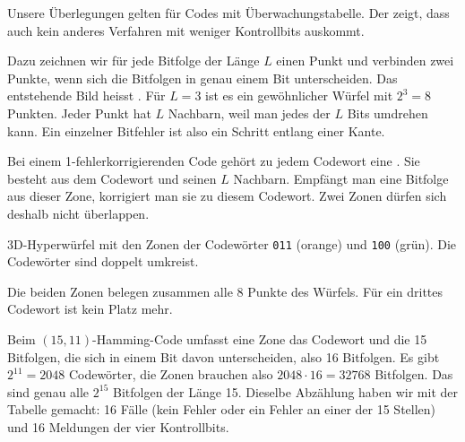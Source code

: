 \begin{myexcursion}
    Unsere Überlegungen gelten für Codes mit Überwachungstabelle. Der
     zeigt, dass auch kein anderes Verfahren mit
    weniger Kontrollbits auskommt.

    Dazu zeichnen wir für jede Bitfolge der Länge \(L\) einen Punkt und
    verbinden zwei Punkte, wenn sich die Bitfolgen in genau einem Bit
    unterscheiden. Das entstehende Bild heisst
    . Für \(L=3\) ist es ein
    gewöhnlicher Würfel mit \(2^3=8\) Punkten. Jeder
    Punkt hat \(L\) Nachbarn, weil man jedes der \(L\) Bits umdrehen
    kann. Ein einzelner Bitfehler ist also ein Schritt entlang einer
    Kante.

    Bei einem 1-fehlerkorrigierenden Code gehört zu jedem Codewort eine
    . Sie besteht aus dem Codewort und seinen \(L\) Nachbarn.
    Empfängt man eine Bitfolge aus dieser Zone, korrigiert man sie zu
    diesem Codewort. Zwei Zonen dürfen sich deshalb nicht überlappen.

    \begin{center}

        {\small 3D-Hyperwürfel mit den Zonen der Codewörter \texttt{011}
        (orange) und \texttt{100} (grün). Die Codewörter sind doppelt
        umkreist.}
    \end{center}

    Die beiden Zonen belegen zusammen alle 8 Punkte des Würfels. Für ein
    drittes Codewort ist kein Platz mehr.

    Beim \((15,11)\)-Hamming-Code umfasst eine Zone das Codewort und die
    15 Bitfolgen, die sich in einem Bit davon unterscheiden, also
    16 Bitfolgen. Es gibt \(2^{11}=2048\) Codewörter, die Zonen brauchen
    also \(2048\cdot 16=32768\) Bitfolgen. Das sind genau alle \(2^{15}\)
    Bitfolgen der Länge 15. Dieselbe Abzählung haben wir mit der Tabelle
    gemacht: 16 Fälle (kein Fehler oder ein Fehler an einer der
    15 Stellen) und 16 Meldungen der vier Kontrollbits.
\end{myexcursion}


